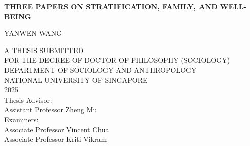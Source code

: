 \begin{titlepage}
    \begin{center}
        \vspace*{2cm}

        \Large
        {\bf THREE PAPERS ON STRATIFICATION, FAMILY, AND WELL-BEING}

        \vspace{2cm}

        \large
        YANWEN WANG

        \vfill

        \normalsize
        A THESIS SUBMITTED\\[0.3cm]
        FOR THE DEGREE OF DOCTOR OF PHILOSOPHY (SOCIOLOGY)\\
        DEPARTMENT OF SOCIOLOGY AND ANTHROPOLOGY\\
        NATIONAL UNIVERSITY OF SINGAPORE\\[2cm]

        2025\\[2cm]

        Thesis Advisor:\\
        Assistant Professor Zheng Mu\\[1cm]

        Examiners:\\
        Associate Professor Vincent Chua\\
        Associate Professor Kriti Vikram

    \end{center}
\end{titlepage}